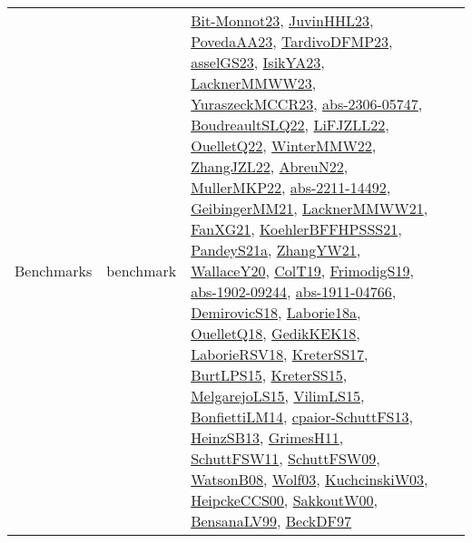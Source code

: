 {\begin{longtable}{llp{6cm}p{6cm}p{6cm}}
Benchmarks & benchmark & \href{papers/Bit-Monnot23.pdf}{Bit-Monnot23}\cite{Bit-Monnot23}, \href{papers/JuvinHHL23.pdf}{JuvinHHL23}\cite{JuvinHHL23}, \href{papers/PovedaAA23.pdf}{PovedaAA23}\cite{PovedaAA23}, \href{papers/TardivoDFMP23.pdf}{TardivoDFMP23}\cite{TardivoDFMP23}, \href{papers/asselGS23.pdf}{asselGS23}\cite{asselGS23}, \href{articles/IsikYA23.pdf}{IsikYA23}\cite{IsikYA23}, \href{articles/LacknerMMWW23.pdf}{LacknerMMWW23}\cite{LacknerMMWW23}, \href{articles/YuraszeckMCCR23.pdf}{YuraszeckMCCR23}\cite{YuraszeckMCCR23}, \href{articles/abs-2306-05747.pdf}{abs-2306-05747}\cite{abs-2306-05747}, \href{papers/BoudreaultSLQ22.pdf}{BoudreaultSLQ22}\cite{BoudreaultSLQ22}, \href{papers/LiFJZLL22.pdf}{LiFJZLL22}\cite{LiFJZLL22}, \href{papers/OuelletQ22.pdf}{OuelletQ22}\cite{OuelletQ22}, \href{papers/WinterMMW22.pdf}{WinterMMW22}\cite{WinterMMW22}, \href{papers/ZhangJZL22.pdf}{ZhangJZL22}\cite{ZhangJZL22}, \href{articles/AbreuN22.pdf}{AbreuN22}\cite{AbreuN22}, \href{articles/MullerMKP22.pdf}{MullerMKP22}\cite{MullerMKP22}, \href{articles/abs-2211-14492.pdf}{abs-2211-14492}\cite{abs-2211-14492}, \href{papers/GeibingerMM21.pdf}{GeibingerMM21}\cite{GeibingerMM21}, \href{papers/LacknerMMWW21.pdf}{LacknerMMWW21}\cite{LacknerMMWW21}, \href{articles/FanXG21.pdf}{FanXG21}\cite{FanXG21}, \href{articles/KoehlerBFFHPSSS21.pdf}{KoehlerBFFHPSSS21}\cite{KoehlerBFFHPSSS21}, \href{articles/PandeyS21a.pdf}{PandeyS21a}\cite{PandeyS21a}, \href{articles/ZhangYW21.pdf}{ZhangYW21}\cite{ZhangYW21}, \href{articles/WallaceY20.pdf}{WallaceY20}\cite{WallaceY20}, \href{papers/ColT19.pdf}{ColT19}\cite{ColT19}, \href{papers/FrimodigS19.pdf}{FrimodigS19}\cite{FrimodigS19}, \href{articles/abs-1902-09244.pdf}{abs-1902-09244}\cite{abs-1902-09244}, \href{articles/abs-1911-04766.pdf}{abs-1911-04766}\cite{abs-1911-04766}, \href{papers/DemirovicS18.pdf}{DemirovicS18}\cite{DemirovicS18}, \href{papers/Laborie18a.pdf}{Laborie18a}\cite{Laborie18a}, \href{papers/OuelletQ18.pdf}{OuelletQ18}\cite{OuelletQ18}, \href{articles/GedikKEK18.pdf}{GedikKEK18}\cite{GedikKEK18}, \href{articles/LaborieRSV18.pdf}{LaborieRSV18}\cite{LaborieRSV18}, \href{articles/KreterSS17.pdf}{KreterSS17}\cite{KreterSS17}, \href{papers/BurtLPS15.pdf}{BurtLPS15}\cite{BurtLPS15}, \href{papers/KreterSS15.pdf}{KreterSS15}\cite{KreterSS15}, \href{papers/MelgarejoLS15.pdf}{MelgarejoLS15}\cite{MelgarejoLS15}, \href{papers/VilimLS15.pdf}{VilimLS15}\cite{VilimLS15}, \href{papers/BonfiettiLM14.pdf}{BonfiettiLM14}\cite{BonfiettiLM14}, \href{papers/cpaior-SchuttFS13.pdf}{cpaior-SchuttFS13}\cite{cpaior-SchuttFS13}, \href{articles/HeinzSB13.pdf}{HeinzSB13}\cite{HeinzSB13}, \href{papers/GrimesH11.pdf}{GrimesH11}\cite{GrimesH11}, \href{articles/SchuttFSW11.pdf}{SchuttFSW11}\cite{SchuttFSW11}, \href{papers/SchuttFSW09.pdf}{SchuttFSW09}\cite{SchuttFSW09}, \href{papers/WatsonB08.pdf}{WatsonB08}\cite{WatsonB08}, \href{papers/Wolf03.pdf}{Wolf03}\cite{Wolf03}, \href{articles/KuchcinskiW03.pdf}{KuchcinskiW03}\cite{KuchcinskiW03}, \href{articles/HeipckeCCS00.pdf}{HeipckeCCS00}\cite{HeipckeCCS00}, \href{articles/SakkoutW00.pdf}{SakkoutW00}\cite{SakkoutW00}, \href{articles/BensanaLV99.pdf}{BensanaLV99}\cite{BensanaLV99}, \href{papers/BeckDF97.pdf}{BeckDF97}\cite{BeckDF97} & 
\end{longtable}}
